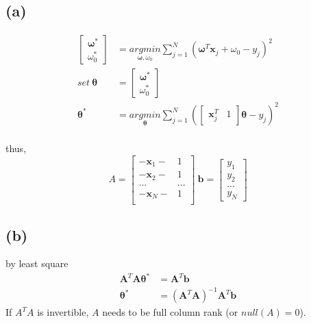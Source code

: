 \documentclass[11pt]{article}
\begin{document}
\subsection*{(a)}
\begin{equation}	\label{eq2(a)}
\begin{split}
\begin{bmatrix}\pmb{\omega}^*\\ \omega^*_0\end{bmatrix}
&=\underset{\pmb{\omega},\omega_0}{argmin}\sum_{j=1}^N(\pmb{\omega}^T\pmb{x}_j+\omega_0-y_j)^2\\
set\ \pmb{\theta}&=\begin{bmatrix}\pmb{\omega}^*\\ \omega^*_0\end{bmatrix}\\
\pmb{\theta}^*&=\underset{\pmb{\theta}}{argmin}\sum_{j=1}^N(\begin{bmatrix}\pmb{x}_j^T & 1\end{bmatrix}\pmb{\theta}-y_j)^2\\
\end{split}
\end{equation}
\begin{center}
thus,\\
$$A=\begin{bmatrix}
-\pmb{x}_1- & 1\\
-\pmb{x}_2- & 1\\
...& ...\\
-\pmb{x}_N- & 1\\
\end{bmatrix}\ 
\pmb{b}=\begin{bmatrix}
y_1\\
y_2\\
...\\
y_N
\end{bmatrix}$$
\end{center}

\subsection*{(b)}
by least square
\begin{equation}	\label{eq2(b)}
\begin{split}
\pmb{A}^T\pmb{A\theta}^*&=\pmb{A}^T\pmb{b}\\
\pmb{\theta}^*&=(\pmb{A}^T\pmb{A})^{-1}\pmb{A}^T\pmb{b}
\end{split}
\end{equation}
If $A^TA$ is invertible, $A$ needs to be full column rank (or $null(A)=0$).\\
\end{document}
